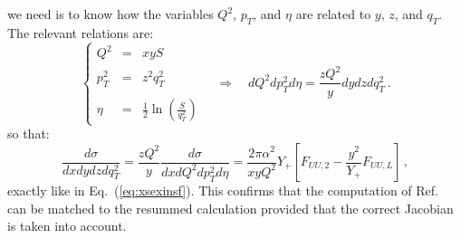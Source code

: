 \documentclass[10pt,a4paper]{article}
\begin{document}
we need is to know how the variables $Q^2$, $p_T$, and $\eta$ are
related to $y$, $z$, and $q_T$. The relevant relations are:
\begin{equation}
\left\{\begin{array}{rcl}
Q^2 &=& xyS\\
\\
p_T^2 &=& z^2 q_T^2\\
\\
\eta &=& \displaystyle \frac{1}{2}\ln\left(\frac{S}{q_T^2}\right)
\end{array}\right.\quad\Longrightarrow\quad dQ^2dp_T^2d\eta = \frac{zQ^2}{y} dydzdq_T^2\,.
\end{equation}
so that:
\begin{equation}
  \frac{d\sigma}{dx dy dz dq_T^2} = \frac{zQ^2}{y}\frac{d\sigma}{dxdQ^2d p_T^2
    d\eta} = \frac{2\pi\alpha^2}{xyQ^2}Y_+\left[F_{UU,2}-\frac{y^2}{Y_+}F_{UU,L}\right]\,,
\end{equation}
exactly like in Eq.~(\ref{eq:xsexinsf}). This confirms that the
computation of Ref.~\cite{Daleo:2004pn} can be matched to the resummed
calculation provided that the correct Jacobian is taken into account.


\newpage
\end{document}
